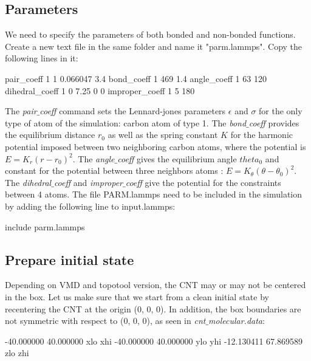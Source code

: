 \noindent \subsection{Parameters}

We need to specify the parameters of both bonded and
non-bonded functions. Create a new text file in the same
folder and name it "parm.lammps". Copy the following lines
in it:

\begin{lcverbatim}
pair_coeff 1 1 0.066047 3.4
bond_coeff 1 469 1.4
angle_coeff 1 63 120
dihedral_coeff 1 0 7.25 0 0
improper_coeff 1 5 180
\end{lcverbatim}

\noindent The \textit{pair$\_$coeff} command sets the Lennard-jones parameters
$\epsilon$ and $\sigma$ for the only type of
atom of the simulation: carbon atom of type 1. The
\textit{bond$\_$coeff} provides the equilibrium distance $r_0$ as
well as the spring constant $K$ for the harmonic
potential imposed between two neighboring carbon atoms,
where the potential is $E = K_r ( r - r_0)^2$. The
\textit{angle$\_$coeff} gives the equilibrium angle $theta_0$ and
constant for the potential between three neighbors atoms :
$E = K_\theta ( \theta - \theta_0)^2$. The \textit{dihedral$\_$coeff}
and \textit{improper$\_$coeff} give the potential for the constraints
between 4 atoms. The file PARM.lammps need to be included in the
simulation by adding the following line to input.lammps:

\begin{lcverbatim}
include parm.lammps
\end{lcverbatim}

\noindent \subsection{Prepare initial state}

Depending on VMD and topotool version, the CNT may or may not be centered in 
the box. Let us make sure that we start from a clean initial state by
recentering the CNT at the origin (0, 0, 0). In addition, the box boundaries 
are not symmetric with respect to (0, 0, 0), as seen in \textit{cnt$\_$molecular.data}:

\begin{lcverbatim}
-40.000000 40.000000  xlo xhi
-40.000000 40.000000  ylo yhi
-12.130411 67.869589  zlo zhi

\end{lcverbatim}

